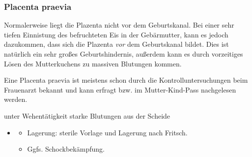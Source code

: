
\subsubsection{Placenta praevia}

Normalerweise liegt die Plazenta nicht vor dem Geburtskanal. Bei einer sehr
tiefen Einnistung des befruchteten Eis in der Gebärmutter, kann es jedoch
dazukommen, dass sich die Plazenta \emph{vor} dem Geburtskanal bildet. Dies ist
natürlich ein sehr großes Geburtshindernis, außerdem kann
es durch vorzeitiges Lösen des Mutterkuchens zu massiven Blutungen kommen.

Eine Placenta praevia ist meistens schon durch die Kontrolluntersuchungen beim
Frauenarzt bekannt und kann erfragt bzw. im Mutter-Kind-Pass nachgelesen werden.

unter Wehentätigkeit starke Blutungen aus der Scheide

{
\begin{itemize}
    \item \TxMassVitBes
    \begin{itemize}
        \item Lagerung: sterile Vorlage und Lagerung nach Fritsch.
        \item Ggfs. Schockbekämpfung.
    \end{itemize}
\end{itemize}
}

% 
% 
% 
% 
% 
% 
% 
% 
% 
% 
% 
% 
% 
% 
% 
% 

